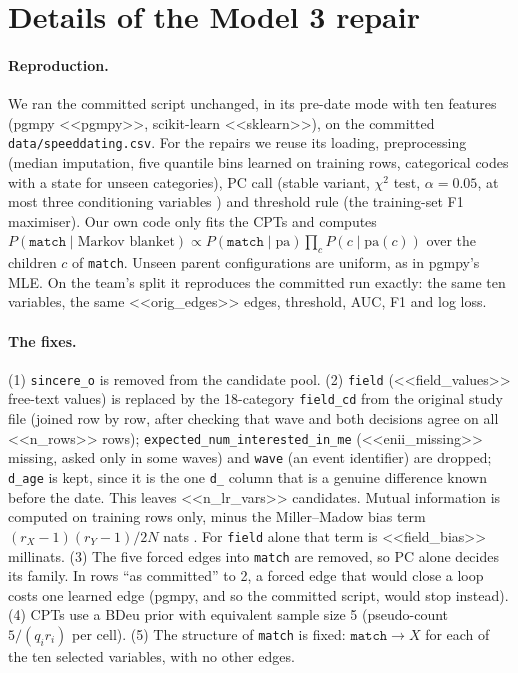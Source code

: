 \section{Details of the Model 3 repair}\label{app:model3fix}

\paragraph{Reproduction.} We ran the committed script unchanged, in its pre-date
mode with ten features (pgmpy <<pgmpy>>, scikit-learn <<sklearn>>), on the committed
\texttt{data/speeddating.csv}. For the repairs we reuse its loading, preprocessing (median
imputation, five quantile bins learned on training rows, categorical codes with a state for unseen
categories), PC call (stable variant, $\chi^2$ test, $\alpha=0.05$, at most three conditioning
variables \cite{spirtes2000causation}) and threshold rule (the training-set F1 maximiser). Our own
code only fits the CPTs and computes $P(\texttt{match}\mid\text{Markov blanket})\propto
P(\texttt{match}\mid\mathrm{pa})\prod_{c}P(c\mid\mathrm{pa}(c))$ over the children $c$ of
\texttt{match}. Unseen parent configurations are uniform, as in pgmpy's MLE. On the team's split it
reproduces the committed run exactly: the same ten variables, the same <<orig_edges>> edges, threshold,
AUC, F1 and log loss.

\paragraph{The fixes.} (1) \texttt{sincere\_o} is removed from the candidate pool. (2)
\texttt{field} (<<field_values>> free-text values) is replaced by the 18-category
\texttt{field\_cd} from the original study file (joined row by row, after checking that wave and
both decisions agree on all <<n_rows>> rows); \texttt{expected\_num\_interested\_in\_me}
(<<enii_missing>> missing, asked only in some waves) and \texttt{wave} (an event identifier) are
dropped; \texttt{d\_age} is kept, since it is the one \texttt{d\_} column that is a genuine
difference known before the date. This leaves <<n_lr_vars>> candidates. Mutual information is
computed on training rows only, minus the Miller--Madow bias term $(r_X-1)(r_Y-1)/2N$ nats
\cite{miller1955note}. For \texttt{field} alone that term is <<field_bias>> millinats.
(3) The five forced edges into \texttt{match} are removed, so PC alone decides its family. In rows
``as committed'' to 2, a forced edge that would close a loop costs one learned edge (pgmpy, and so
the committed script, would stop instead). (4) CPTs use a BDeu prior with equivalent sample size 5
(pseudo-count $5/(q_i r_i)$ per cell). (5) The structure of \texttt{match} is fixed:
$\texttt{match}\to X$ for each of the ten selected variables, with no other edges.


